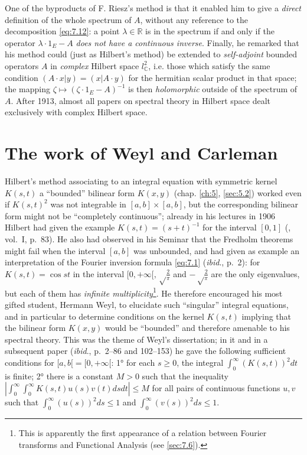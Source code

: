 \documentclass[12pt,a4paper,leqno,twoside]{extbook}
\newcommand{\C}{\mathbb{C}}
\newcommand{\R}{\mathbb{R}}
\begin{document}
One of the byproducts of F. Riesz's method is that it enabled him to give a \emph{direct} definition of the whole spectrum of \(A\), without any reference to the decomposition \eqref{eq:7.12}: a point \(\lambda \in \R\) is in the spectrum if and only if the operator \(\lambda \cdot 1_E - A\) \emph{does not have a continuous inverse}. Finally, he remarked that his method could (just as Hilbert's method) be extended to \emph{self-adjoint} bounded operators \(A\) in \emph{complex} Hilbert space \(l^2_{\C}\), i.e. those which satisfy the same condition \((A \cdot x|y) = (x|A \cdot y)\) for the hermitian scalar product in that space; the mapping \(\zeta \mapsto (\zeta \cdot 1_E - A)^{-1}\) is then \emph{holomorphic} outside of the spectrum of \(A\). After 1913, almost all papers on spectral theory in Hilbert space dealt exclusively with complex Hilbert space.

\section{The work of Weyl and Carleman}
\label{sec:7.3}

Hilbert's method associating to an integral equation with symmetric kernel \(K(s,t)\) a ``bounded'' bilinear form \(K(x,y)\) (chap. \ref{ch:5}, \ref{sec:5.2}) worked even if \(K(s,t)^2\) was not integrable in \([a,b] \times [a,b]\), but the corresponding bilinear form might not be ``completely continuous''; already in his lectures in 1906 Hilbert had given the example \(K(s,t) = (s+t)^{-1}\) for the interval \([0,1]\) (\cite{227}, vol.~I, p.~83). He also had observed in his Seminar that the Fredholm theorems might fail when the interval \([a,b]\) was unbounded, and had given as example an interpretation of the Fourier inversion formula \eqref{eq:7.1} (\emph{ibid}., p.~2): for \(K(s,t) = \cos{st}\) in the interval \([0,+\infty[, \sqrt\frac{2}{\pi}\) and \(-\sqrt\frac{2}{\pi}\) are the only eigenvalues, but each of them has \emph{infinite multiplicity}\footnote{This is apparently the first appearance of a relation between Fourier transforms and Functional Analysis (see \ref{sec:7.6}).}. He therefore encouraged his most gifted student, Hermann Weyl, to elucidate such ``singular'' integral equations, and in particular to determine conditions on the kernel \(K(s,t)\) implying that the bilinear form \(K(x,y)\) would be ``bounded'' and therefore amenable to his spectral theory. This was the theme of Weyl's dissertation; in it and in a subsequent paper (\emph{ibid}., p.~2--86 and 102--153) he gave the following sufficient conditions for \([a,b[ = [0,+\infty[\): 1° for each \(s \geq 0\), the integral \(\int_0^\infty (K(s,t))^2 dt\) is finite; 2° there is a constant \(M > 0\) such that the inequality \(\left| \int_0^\infty \int_0^\infty K(s,t)u(s)v(t)dsdt \right| \leq M\) for all pairs of continuous functions \(u, v\) such that \(\int_0^\infty (u(s))^2 ds \leq 1\) and \(\int_0^\infty (v(s))^2 ds \leq 1\).
\end{document}
